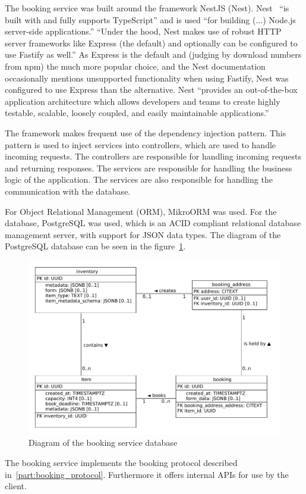 The booking service was built around the framework NestJS (Nest). Nest~\cite{nestjs} \enquote{is built with and fully supports TypeScript} and is used \enquote{for building (...) Node.js server-side applications.} \enquote{Under the hood, Nest makes use of robust HTTP server frameworks like Express (the default) and optionally can be configured to use Fastify as well.} As Express is the default and (judging by download numbers from npm) the much more popular choice, and the Nest documentation~\cite{nestjs} occasionally mentions unsupported functionality when using Fastify, Nest was configured to use Express than the alternative. Nest \enquote{provides an out-of-the-box application architecture which allows developers and teams to create highly testable, scalable, loosely coupled, and easily maintainable applications.}

The framework makes frequent use of the dependency injection pattern. This pattern is used to inject services into controllers, which are used to handle incoming requests. The controllers are responsible for handling incoming requests and returning responses. The services are responsible for handling the business logic of the application. The services are also responsible for handling the communication with the database.

For Object Relational Management (ORM), MikroORM was used. For the database, PostgreSQL was used, which is an ACID compliant relational database management server, with support for JSON data types. The diagram of the PostgreSQL database can be seen in the figure~\ref{fig:db_diagram}.

\begin{figure}
    \centering
    \includegraphics[width=1.0\textwidth]{content/implementation/db_diagram.uxf.svg.pdf}
    \caption[Diagram of the booking service database]{Diagram of the booking service database}
    \label{fig:db_diagram}
\end{figure}

The booking service implements the booking protocol described in~\ref{part:booking_protocol}. Furthermore it offers internal APIs for use by the client.
